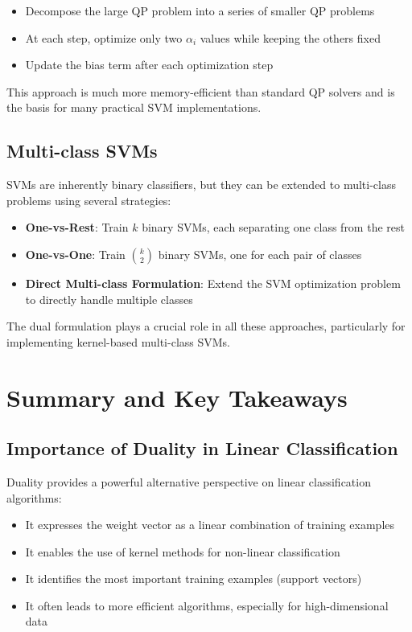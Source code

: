 \documentclass{article}
\begin{document}
\begin{itemize}
    \item Decompose the large QP problem into a series of smaller QP problems
    \item At each step, optimize only two $\alpha_i$ values while keeping the others fixed
    \item Update the bias term after each optimization step
\end{itemize}

This approach is much more memory-efficient than standard QP solvers and is the basis for many practical SVM implementations.

\subsection{Multi-class SVMs}
SVMs are inherently binary classifiers, but they can be extended to multi-class problems using several strategies:

\begin{itemize}
    \item \textbf{One-vs-Rest}: Train $k$ binary SVMs, each separating one class from the rest
    \item \textbf{One-vs-One}: Train $\binom{k}{2}$ binary SVMs, one for each pair of classes
    \item \textbf{Direct Multi-class Formulation}: Extend the SVM optimization problem to directly handle multiple classes
\end{itemize}

The dual formulation plays a crucial role in all these approaches, particularly for implementing kernel-based multi-class SVMs.

\section{Summary and Key Takeaways}

\subsection{Importance of Duality in Linear Classification}
Duality provides a powerful alternative perspective on linear classification algorithms:

\begin{itemize}
    \item It expresses the weight vector as a linear combination of training examples
    \item It enables the use of kernel methods for non-linear classification
    \item It identifies the most important training examples (support vectors)
    \item It often leads to more efficient algorithms, especially for high-dimensional data
\end{itemize}
\end{document}
